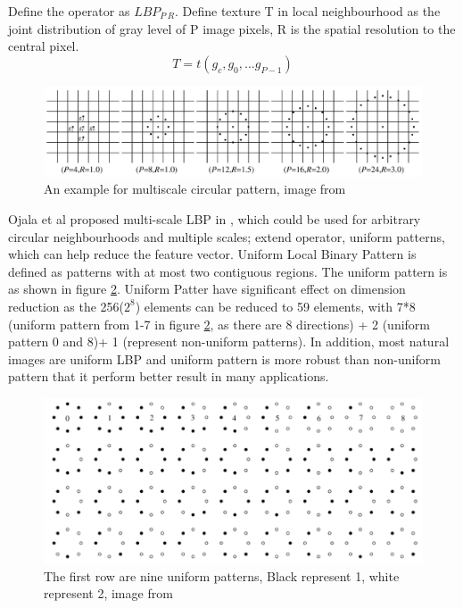 \newline
Define the operator as $LBP_{P\ R}$. Define texture T in local neighbourhood as the joint distribution of gray level of P image pixels, R is the spatial resolution to the central pixel.
\begin{equation}
T = t(g_{c},g_{0},...g_{P-1})
\label{eq:LBPDT}
\end{equation}
\begin{figure}[ht]
\centering
\captionsetup{justification=centering, margin=1cm}
\includegraphics[width = \textwidth]{imgs/LBP_Example_3.png}
\caption{An example for multiscale circular pattern, image from \cite{ojala2002multiresolution}}
\label{fig:LBPE03}
\end{figure}

Ojala et al proposed multi-scale LBP in \cite{ojala2002multiresolution}, which could be used for arbitrary circular neighbourhoods and multiple scales; extend operator, uniform patterns, which can help reduce the feature vector. Uniform Local Binary Pattern is defined as patterns with at most two contiguous regions. The uniform pattern is as shown in figure \ref{fig:LBPE04}. Uniform Patter have significant effect on dimension reduction as the 256($2^8$) elements can be reduced to 59 elements, with 7*8 (uniform pattern from 1-7 in figure \ref{fig:LBPE04}, as there are 8 directions) + 2 (uniform pattern 0 and 8)+ 1 (represent non-uniform patterns). In addition, most natural images are uniform LBP and uniform pattern is more robust than non-uniform pattern that it perform better result in many applications.
\begin{figure}[ht]
\centering
\captionsetup{justification=centering, margin=1cm}
\includegraphics[width = \textwidth]{imgs/LBP_Example_4.png}
\caption{The first row are nine uniform patterns, Black represent 1, white represent 2, image from \cite{ojala2002multiresolution}}
\label{fig:LBPE04}
\end{figure}

